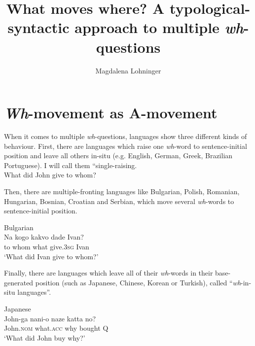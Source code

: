 \documentclass[output=paper,colorlinks,citecolor=brown]{langscibook}
\author{Magdalena Lohninger\affiliation{University of Vienna}}
\title[What moves where?]
      {What moves where? A typological-syntactic approach to multiple \textit{wh}-questions}
\begin{document}
\maketitle

\section{\textit{Wh}-movement as A-movement}
When it comes to multiple \textit{wh}-questions, languages show three different kinds of behaviour. First, there are languages which raise one \textit{wh}-word to sentence-initial position and leave all others in-situ (e.g. English, German, Greek, Brazilian Portuguese). I will call them “single-raising.
 \citep[351]{bovskovic2002multiple}\\
What did John give to whom?
\z

\noindent Then, there are multiple-fronting languages like Bulgarian, Polish, Romanian, Hungarian, Bosnian, Croatian and Serbian,  which move several \textit{wh}-words to sentence-initial position.

\ea Bulgarian \citep[351]{bovskovic2002multiple}\\
\gll Na kogo kakvo dade Ivan?\\
to whom what give.\textsc{3sg} Ivan\\ 
\glt `What did Ivan give to whom?'
\z

\noindent Finally, there are languages which leave all of their \textit{wh}-words in their base-gen\-er\-at\-ed position (such as Japanese, Chinese, Korean or Turkish), called “\textit{wh}-in-situ languages”.

\ea Japanese \citep[31]{richards1997}\\
\gll John-ga nani-o naze katta no?\\
John.\textsc{nom} what.\textsc{acc} why bought \textsc{Q}\\ 
\glt `What did John buy why?'
\z
\end{document}
